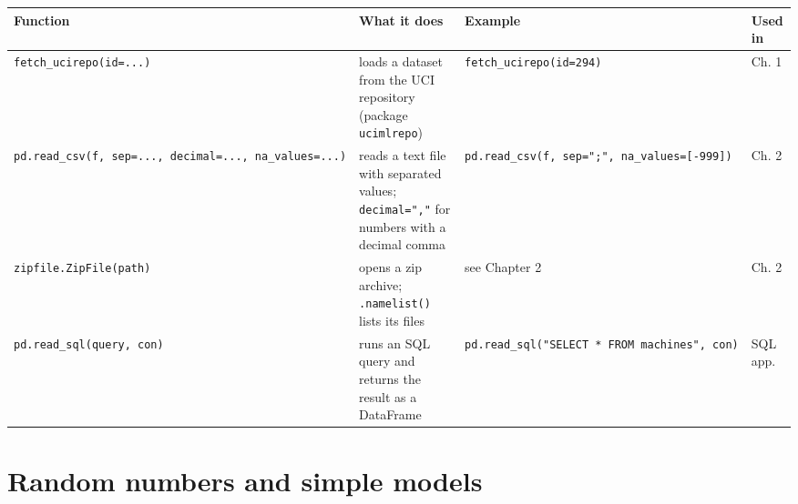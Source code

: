 \documentclass[
  letterpaper,
  DIV=11,
  numbers=noendperiod]{scrreprt}
\begin{document}
\begin{longtable}[]{@{}
  >{\raggedright\arraybackslash}p{}
  >{\raggedright\arraybackslash}p{}
  >{\raggedright\arraybackslash}p{}
  >{\raggedright\arraybackslash}p{}@{}}
\toprule\noalign{}
\begin{minipage}[b]{\linewidth}\raggedright
Function
\end{minipage} & \begin{minipage}[b]{\linewidth}\raggedright
What it does
\end{minipage} & \begin{minipage}[b]{\linewidth}\raggedright
Example
\end{minipage} & \begin{minipage}[b]{\linewidth}\raggedright
Used in
\end{minipage} \\
\midrule\noalign{}
\endhead
\bottomrule\noalign{}
\endlastfoot
\texttt{fetch\_ucirepo(id=...)} & loads a dataset from the UCI
repository (package \texttt{ucimlrepo}) &
\texttt{fetch\_ucirepo(id=294)} & Ch. 1 \\
\texttt{pd.read\_csv(f,\ sep=...,\ decimal=...,\ na\_values=...)} &
reads a text file with separated values; \texttt{decimal=","} for
numbers with a decimal comma &
\texttt{pd.read\_csv(f,\ sep=";",\ na\_values={[}-999{]})} & Ch. 2 \\
\texttt{zipfile.ZipFile(path)} & opens a zip archive;
\texttt{.namelist()} lists its files & see Chapter 2 & Ch. 2 \\
\texttt{pd.read\_sql(query,\ con)} & runs an SQL query and returns the
result as a DataFrame &
\texttt{pd.read\_sql("SELECT\ *\ FROM\ machines",\ con)} & SQL app. \\
\end{longtable}

\section{Random numbers and simple
models}\label{random-numbers-and-simple-models}
\end{document}
